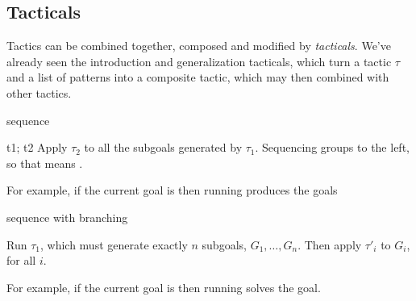 




















\subsection{Tacticals}
\label{subsec:tacticals}

Tactics can be combined together, composed and modified by
\emph{tacticals}. We've already seen the introduction and generalization
tacticals, which turn a tactic $\tau$ and a list of patterns into
a composite tactic, which may then combined with other tactics.

\begin{tactic}{sequence}
  \begin{tsyntax}[empty]{t1; t2}
  Apply $\tau_2$ to all the subgoals generated by $\tau_1$.
  Sequencing groups to the left, so that
   means
  .
  
  For example, if the current goal is
   then
  running 
  produces the goals
\end{tsyntax}
\end{tactic}

\begin{tactic}{sequence with branching}
  \begin{tsyntax}[empty]{}
    Run $\tau_1$, which must generate exactly $n$ subgoals, $G_1,\ldots,G_n$.
    Then apply $\tau'_i$ to $G_i$, for all $i$.

  For example, if the current goal is
   then
  running 
  solves the goal.
  \end{tsyntax}
\end{tactic}

